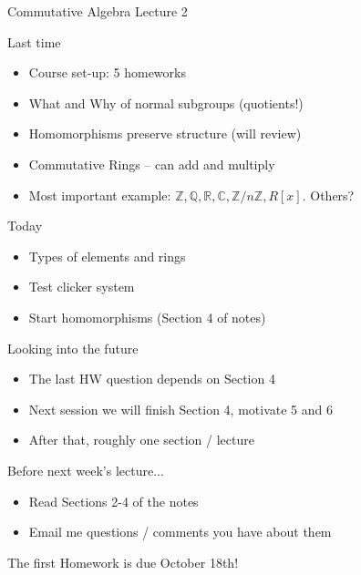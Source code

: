 \documentclass{beamer}
\newcommand{\C}{\mathbb{C}}
\newcommand{\Z}{\mathbb{Z}}
\newcommand{\Q}{\mathbb{Q}}
\newcommand{\R}{\mathbb{R}}
\begin{document}
\begin{frame}{Commutative Algebra Lecture 2}
\begin{block}{Last time}
\begin{itemize}
    \item Course set-up: 5 homeworks
    \item What and Why of normal subgroups (quotients!)
    \item Homomorphisms preserve structure (will review)
    \item Commutative Rings -- can add and multiply
    \item Most important example: $\Z,\Q, \R,\C, \Z/n\Z, R[x]$. Others?
    \end{itemize}
\end{block}

\begin{block}{Today}
\begin{itemize}
    \item Types of elements and rings
    \item Test clicker system
        \item Start homomorphisms (Section 4 of notes)
\end{itemize}
\end{block}
\end{frame}

\begin{frame}{Looking into the future}
\begin{itemize}
\item The last HW question depends on Section 4
\item Next session we will finish Section 4, motivate 5 and 6
\item After that, roughly one section / lecture
\end{itemize}

\begin{block}{Before next week's lecture...}
  \begin{itemize}
  \item Read Sections 2-4 of the notes
    \item Email me questions / comments you have about them
    \end{itemize}
\end{block}
\begin{block}{The first Homework is due October 18th!}
  \end{block}


\end{frame}
\end{document}
